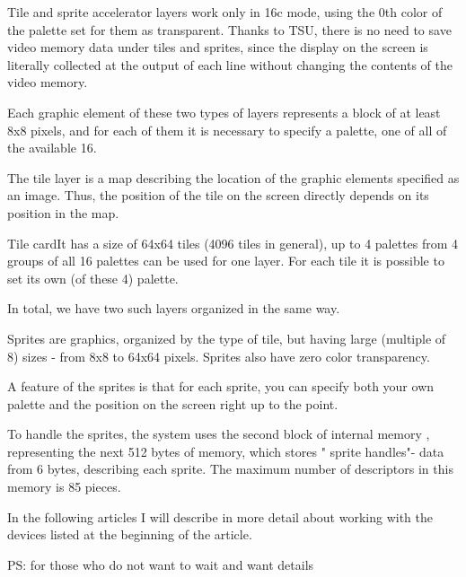 Tile and sprite accelerator layers work only in 16c mode, using the
0th color of the palette set for them as transparent. Thanks to TSU,
there is no need to save video memory data under tiles and sprites,
since the display on the screen is literally collected at the output
of each line without changing the contents of the video memory.

Each graphic element of these two types of layers represents a block
of at least 8x8 pixels, and for each of them it is necessary to
specify a palette, one of all of the available 16.

The tile layer is a map describing the location of the graphic
elements specified as an image. Thus, the position of the tile on the
screen directly depends on its position in the map.

Tile cardIt has a size of 64x64 tiles (4096 tiles in general), up to 4
palettes from 4 groups of all 16 palettes can be used for one
layer. For each tile it is possible to set its own (of these 4)
palette.

In total, we have two such layers organized in the same way.

Sprites are graphics, organized by the type of tile, but having large
(multiple of 8) sizes - from 8x8 to 64x64 pixels. Sprites also have
zero color transparency.

A feature of the sprites is that for each sprite, you can specify both
your own palette and the position on the screen right up to the point.

To handle the sprites, the system uses the second block of internal
memory , representing the next 512 bytes of memory, which stores "
sprite handles"- data from 6 bytes, describing each sprite. The
maximum number of descriptors in this memory is 85 pieces.

In the following articles I will describe in more detail about working
with the devices listed at the beginning of the article.

PS: for those who do not want to wait and want details
